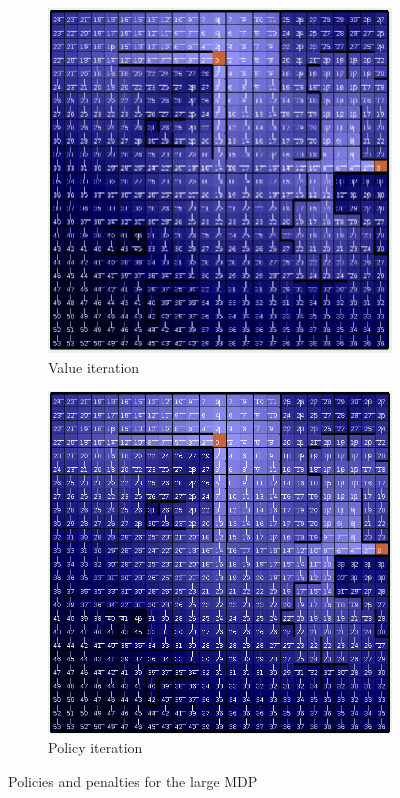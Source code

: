 \documentclass[letterpaper]{article}
\begin{document}
\begin{figure}
	\centering
	\begin{subfigure}{.45\textwidth}
		\centering
		\includegraphics[width=\linewidth]{images/big_vi}
		\caption{Value iteration}
	\end{subfigure}
	\begin{subfigure}{.45\textwidth}
		\centering
		\includegraphics[width=\linewidth]{images/big_pi}
		\caption{Policy iteration}		
	\end{subfigure}
	\caption{Policies and penalties for the large MDP}
	\label{fig:mdp-viz-big}%
\end{figure}%
	
\end{document}
